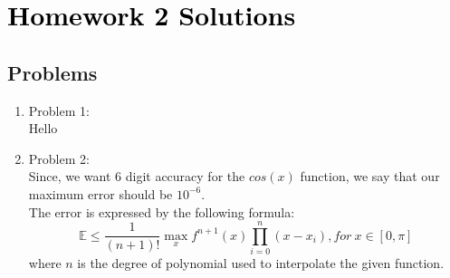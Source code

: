 \documentclass[10pt,letterpaper]{article}
\theoremstyle{definition}
\theoremstyle{remark}
\def\thetitle{\textcolor{black}{Homework 2 Solutions}}
\begin{document}
\section*{\thetitle}

\subsection*{Problems}
\begin{enumerate}[leftmargin=*,itemsep=9ex]
  \item Problem 1: \\
  Hello
  \item Problem 2:\\
  Since, we want 6 digit accuracy for the $cos(x)$ function, we say that our maximum error should be $10^{-6}$.\\
  The error is expressed by the following formula:
  \begin{equation}
    \mathbb{E} \leq \frac{1}{(n+1)!} \max_x{f^{n+1}(x)\prod_{i=0}^{n} (x - x_i)}, for\ x \in [0, \pi]
  \end{equation}
  where $n$ is the degree of polynomial used to interpolate the given function.


\end{enumerate}
\end{document}
